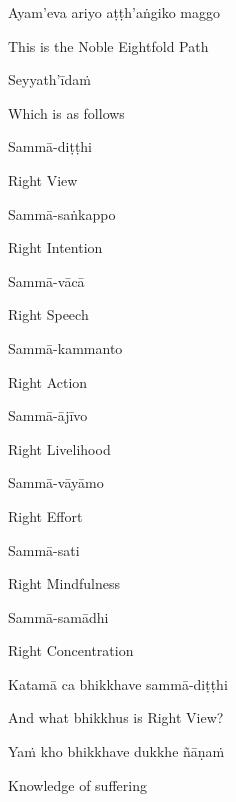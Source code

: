 Ayam'eva ariyo aṭṭh'aṅgiko maggo

\begin{english}
  This is the Noble Eightfold Path
\end{english}

Seyyath'īdaṁ

\begin{english}
  Which is as follows
\end{english}

Sammā-diṭṭhi

\begin{english}
  Right View
\end{english}

Sammā-saṅkappo

\begin{english}
  Right Intention
\end{english}

Sammā-vācā

\begin{english}
  Right Speech
\end{english}

Sammā-kammanto

\begin{english}
  Right Action
\end{english}

Sammā-ājīvo

\begin{english}
  Right Livelihood
\end{english}

Sammā-vāyāmo

\begin{english}
  Right Effort
\end{english}

Sammā-sati

\begin{english}
  Right Mindfulness
\end{english}

Sammā-samādhi

\begin{english}
  Right Concentration
\end{english}

Katamā ca bhikkhave sammā-diṭṭhi

\begin{english}
  And what bhikkhus is Right View?
\end{english}

Yaṁ kho bhikkhave dukkhe ñāṇaṁ

\begin{english}
  Knowledge of suffering
\end{english}

